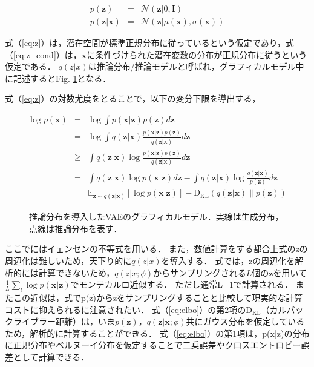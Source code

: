 \begin{eqnarray}
  p(\bm{z}) &=& \mathcal{N}(\bm{z}|0,\bm{I}) \label{eq:z}\\
  p(\bm{z}|\bm{x}) &=& \mathcal{N}(\bm{z}|\mu(\bm{x}),\sigma(\bm{x}))	\label{eq:z_cond}
\end{eqnarray}

式（\ref{eq:z}）は，潜在空間が標準正規分布に従っているという仮定であり，式（\ref{eq:z_cond}）は，$\bm{x}$に条件づけられた潜在変数の分布が正規分布に従うという仮定である．
$q(z|x)$は推論分布/推論モデルと呼ばれ，グラフィカルモデル中に記述するとFig. \ref{fig:vae_cond}となる．

式（\ref{eq:z}）の対数尤度をとることで，以下の変分下限を導出する，

\begin{eqnarray}
  \log p(\bm{x}) &=& \log \int p(\bm{x}|\bm{z}) p(\bm{z}) d\bm{z} \nonumber \\
  &=& \log \int q(\bm{z}|\bm{x}) \frac{p(\bm{x}|\bm{z}) p(\bm{z})}{q(\bm{z}|\bm{x})} d\bm{z} \nonumber \\
  &\geq& \int q(\bm{z}|\bm{x}) \log \frac{p(\bm{x}|\bm{z}) p(\bm{z})}{q(\bm{z}|\bm{x})} d\bm{z} \label{eq:jensen}\\
  &=& \int q(\bm{z}|\bm{x}) \log p(\bm{x}|\bm{z}) d\bm{z} - \int q(\bm{z}|\bm{x}) \log \frac{q(\bm{z}|\bm{x})}{p(\bm{z})} d\bm{z} \nonumber \\
  &=& \mathbb{E}_{\bm{z} \sim q(\bm{z}|\bm{x})} [\log p(\bm{x}|\bm{z})] - \mathrm{D_{KL}}(q(\bm{z}|\bm{x}) \| p(\bm{z})) \label{eq:elbo}
\end{eqnarray}

\begin{figure}[bp]
  \begin{center}
    \caption{推論分布を導入したVAEのグラフィカルモデル．実線は生成分布，点線は推論分布を表す．}
    \label{fig:vae_cond}
  \end{center}
\end{figure}

ここでにはイェンセンの不等式を用いる．
また，数値計算をする都合上式のzの周辺化は難しいため，天下り的に$q(z|x)$を導入する．
式では，zの周辺化を解析的には計算できないため，$q(z|x; \phi)$からサンプリングされる$L$個の$\bm{z}$を用いて$\frac{1}{L} \sum_{l} \log p(\bm{x}|\bm{z})$でモンテカルロ近似する．
ただし通常L=1で計算される．
またこの近似は，式でp(z)からzをサンプリングすることと比較して現実的な計算コストに抑えられるに注意されたい．
式（\ref{eq:elbo}）の第2項の$\mathrm{D_{KL}}$（カルバックライブラー距離）は，いま$p(\bm{z})$，$q(\bm{z}|\bm{x}; \phi)$共にガウス分布を仮定しているため，解析的に計算することができる．
式（\ref{eq:elbo}）の第1項は，p(x|z)の分布に正規分布やベルヌーイ分布を仮定することで二乗誤差やクロスエントロピー誤差として計算できる．

